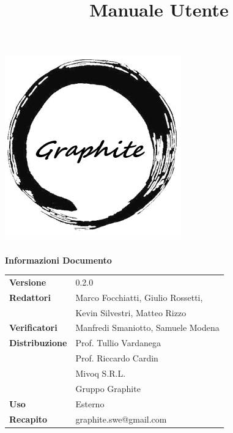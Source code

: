 \documentclass[openany,12pt,a4paper]{report}
\title{Manuale Utente}
\author{}
\newcommand{\versione}{0.2.0}
\begin{document}
	\makeatletter
	\begin{titlepage}
		\setlength{\headsep}{0pt}  
		\begin{center}
			\includegraphics[width=0.5\linewidth]{img/logo.png}\\[1em]
			{\huge \bfseries  \@title }\\[10ex]
			\textbf{\Large Informazioni Documento} \\[2em]
			\bgroup
			\def\arraystretch{1.5}
			\begin{tabular}{l|l}
				\textbf{Versione} & \versione{} \\
				\textbf{Redattori} & Marco Focchiatti, Giulio Rossetti, \\
				& Kevin Silvestri, Matteo Rizzo \\
				\textbf{Verificatori} & Manfredi Smaniotto, Samuele Modena \\
				\textbf{Distribuzione} & Prof. Tullio Vardanega \\
				& Prof. Riccardo Cardin \\
				& Mivoq S.R.L. \\
				& Gruppo Graphite \\
				\textbf{Uso} & Esterno \\
				\textbf{Recapito} & graphite.swe@gmail.com \\
			\end{tabular}
			\egroup
		\end{center}
	\end{titlepage}
	\makeatother
	
	\thispagestyle{empty}
	\newpage
	
	
\end{document}
